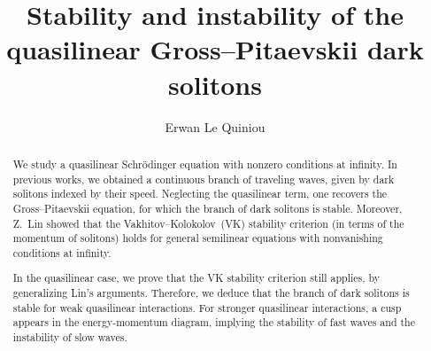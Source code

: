 \documentclass[11pt]{article}
\theoremstyle{plain}
\theoremstyle{definition}
\theoremstyle{remark}
\numberwithin{equation}{section}
\begin{document}
\renewcommand{\thefootnote}{\fnsymbol{footnote}}
\title{Stability and instability of the quasilinear Gross--Pitaevskii dark solitons}

\author{Erwan Le Quiniou\footnotemark[1]}
\date{}
\maketitle


%
%
\begin{abstract} %
	We study a quasilinear Schr\"odinger equation with nonzero conditions at infinity. In previous works, we obtained a continuous branch of traveling waves, given by dark solitons indexed by their speed. Neglecting the quasilinear term, one recovers the Gross--Pitaevskii equation, for which the branch of dark solitons is stable.
	Moreover, Z.~Lin showed that the Vakhitov--Kolokolov~(VK) stability criterion (in terms of the momentum of solitons) holds for general semilinear equations with nonvanishing conditions at infinity. 
	
	In the quasilinear case, we prove that the VK stability criterion still applies, by generalizing Lin's arguments. Therefore, we deduce that the branch of dark solitons is stable for weak quasilinear interactions. For stronger quasilinear interactions, a cusp appears in the energy-momentum diagram, implying the stability of fast waves and the instability of slow waves.  
\end{abstract}
\end{document}
